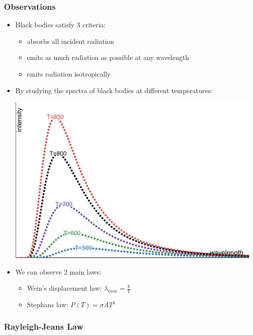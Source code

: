 \documentclass{article}
\begin{document}
\subsubsection*{Observations}
\begin{itemize}
    \item Black bodies satisfy 3 criteria:
    \begin{itemize}
        \item absorbs all incident radiation
        \item emits as much radiation as possible at any wavelength
        \item emits radiation isotropically
    \end{itemize}
    \item By studying the spectra of black bodies at different temperatures:
    
    \includegraphics[width=.5\linewidth]{year1/wfmp/black body radiation/blackbody-spectra.png}
    \item We can observe 2 main laws:
    \begin{itemize}
        \item Wein's displacement law: \(\lambda_{max} = \frac{b}{T}\)
        \item Stephans law: \(P(T) = \sigma AT^4\)
    \end{itemize}
\end{itemize}

\subsubsection*{Rayleigh-Jeans Law}
\end{document}
